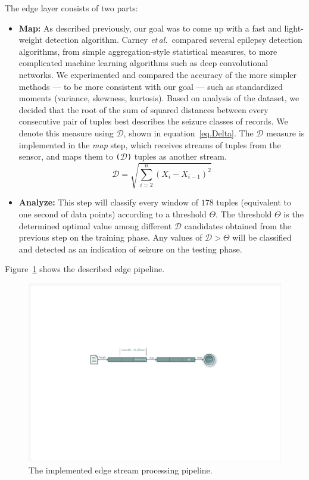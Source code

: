 \documentclass[letterpaper]{article}
\newcommand{\etal}{\emph{et\,al.}\,}
\begin{document}
The edge layer consists of two parts:
\begin{itemize}
  \item \textbf{Map:} As described previously, our goal was to come up with a fast and light-weight detection algorithm. Carney \etal\cite{Carney2011} compared several epilepsy detection algorithms, from simple aggregation-style statistical measures, to more complicated machine learning algorithms such as deep convolutional networks. We experimented and compared the accuracy of the more simpler methods --- to be more consistent with our goal --- such as standardized moments (variance, skewness, kurtosis). Based on analysis of the dataset, we decided that the root of the sum of squared distances between every consecutive pair of tuples best describes the seizure classes of records. We denote this measure using \(\mathcal{D}\), shown in equation~\ref{eq.Delta}. The \(\mathcal{D}\) measure is implemented in the \emph{map} step, which receives streams of tuples from the sensor, and maps them to \texttt{(\(\mathcal{D}\))} tuples as another stream.
  \begin{equation}
    \label{eq.Delta}
    \mathcal{D} = \sqrt{\sum_{i=2}^{n}{(X_i - X_{i-1})^2}}    
  \end{equation}
  \item \textbf{Analyze:} This step will classify every window of \(178\) tuples (equivalent to one second of data points) according to a threshold \(\Theta\). The threshold \(\Theta\) is the determined optimal value among different \(\mathcal{D}\) candidates obtained from the previous step on the training phase. Any values of \(\mathcal{D} > \Theta\) will be classified and detected as an indication of seizure on the testing phase.
\end{itemize}

Figure~\ref{fig.edge-pipeline} shows the described edge pipeline.

\begin{figure}
  \centering
  \includegraphics[width=\textwidth]{figs/Edgent_pipeline.pdf}
  \caption{The implemented edge stream processing pipeline.}
  \label{fig.edge-pipeline}
\end{figure}
\end{document}
